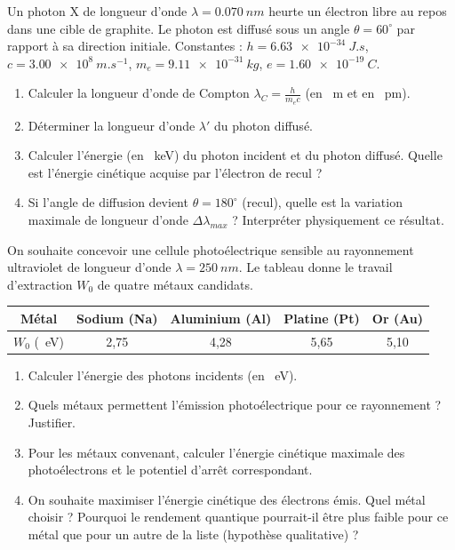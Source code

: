 \documentclass[11pt]{article}
\begin{document}
\begin{exercice}
Un photon X de longueur d'onde $\lambda = \SI{0,070}{nm}$ heurte un électron libre au repos dans une cible de graphite. Le photon est diffusé sous un angle $\theta = 60^\circ$ par rapport à sa direction initiale. Constantes : $h = \SI{6,63e-34}{J.s}$, $c = \SI{3,00e8}{m.s^{-1}}$, $m_e = \SI{9,11e-31}{kg}$, $e = \SI{1,60e-19}{C}$.
\begin{enumerate}
    \item Calculer la longueur d'onde de Compton $\lambda_C = \frac{h}{m_e c}$ (en \SI{}{m} et en \SI{}{pm}).
    \item Déterminer la longueur d'onde $\lambda'$ du photon diffusé.
    \item Calculer l'énergie (en \SI{}{keV}) du photon incident et du photon diffusé. Quelle est l'énergie cinétique acquise par l'électron de recul ?
    \item Si l'angle de diffusion devient $\theta = 180^\circ$ (recul), quelle est la variation maximale de longueur d'onde $\Delta \lambda_{max}$ ? Interpréter physiquement ce résultat.
\end{enumerate}
\end{exercice}

\begin{exercice}
On souhaite concevoir une cellule photoélectrique sensible au rayonnement ultraviolet de longueur d'onde $\lambda = \SI{250}{nm}$. Le tableau donne le travail d'extraction $W_0$ de quatre métaux candidats.

\begin{center}
\begin{tabular}{|c|c|c|c|c|}
\hline
Métal & Sodium (Na) & Aluminium (Al) & Platine (Pt) & Or (Au) \\
\hline
$W_0$ (\SI{}{eV}) & 2,75 & 4,28 & 5,65 & 5,10 \\
\hline
\end{tabular}
\end{center}

\begin{enumerate}
    \item Calculer l'énergie des photons incidents (en \SI{}{eV}).
    \item Quels métaux permettent l'émission photoélectrique pour ce rayonnement ? Justifier.
    \item Pour les métaux convenant, calculer l'énergie cinétique maximale des photoélectrons et le potentiel d'arrêt correspondant.
    \item On souhaite maximiser l'énergie cinétique des électrons émis. Quel métal choisir ? Pourquoi le rendement quantique pourrait-il être plus faible pour ce métal que pour un autre de la liste (hypothèse qualitative) ?
\end{enumerate}
\end{exercice}
\end{document}
